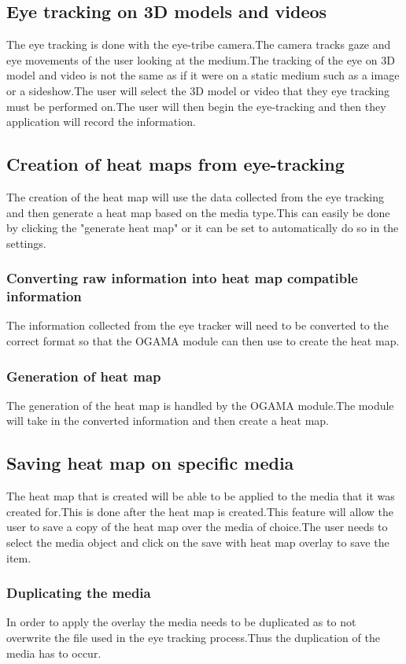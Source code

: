 \iffalse
\subsection{Eye tracking on 3D models and videos}
The eye tracking is done with the eye-tribe camera.The camera tracks gaze and eye movements of the user looking at the medium.The tracking of the eye on 3D model and video is not the same as if it were on a static medium such as a image or a sideshow.The user will select the 3D model or video that they eye tracking must be performed on.The user will then begin the eye-tracking and then they application will record the information.

\subsection{Creation of heat maps from eye-tracking}
The creation of the heat map will use the data collected from the eye tracking and then generate a heat map based on the media type.This can easily be done by clicking the "generate heat map" or it can be set to automatically do so in the settings.
\subsubsection{Converting raw information into heat map compatible information}
The information collected from the eye tracker will need to be converted to the correct format so that the OGAMA module can then use to create the heat map.
\subsubsection{Generation of heat map}
The generation of the heat map is handled by the OGAMA module.The module will take in the converted information and then create a heat map.
\subsection{Saving heat map on specific media}
The heat map that is created will be able to be applied to the media that it was created for.This is done after the heat map is created.This feature will allow the user to save a copy of the heat map over the media of choice.The user needs to select the media object and click on the save with heat map overlay to save the item.
\subsubsection{Duplicating the media}
In order to apply the overlay the media needs to be duplicated as to not overwrite the file used in the eye tracking process.Thus the duplication of the media has to occur.
